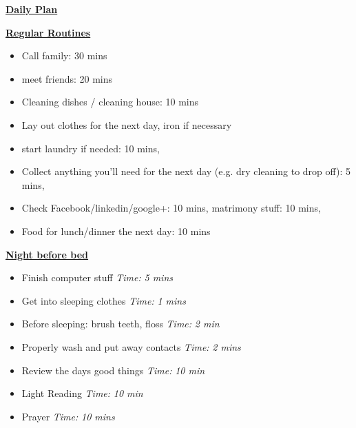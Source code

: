 \documentclass[serif,mathserif,final]{beamer}
\newcommand{\timeEst}[1]{\textit{Time:} \textit{#1}}
\begin{document}
\begin{frame}{}
\begin{columns}[t]
\begin{column}{0.27\linewidth}{\textbf{\underline{Daily Plan}}}
\begin{block}{\small \textbf{\underline{Regular Routines}} }
\begin{itemize}
\item \tiny Call family: 30 mins
\item \tiny meet friends: 20 mins
\item \tiny Cleaning dishes / cleaning house: 10 mins
\item \tiny Lay out clothes for the next day, iron if necessary
\item \tiny start laundry if needed: 10 mins,
\item \tiny Collect anything you’ll need for the next day (e.g. dry cleaning to drop off): 5 mins,
\item \tiny Check Facebook/linkedin/google+: 10 mins, matrimony stuff: 10 mins,
\item \tiny Food for lunch/dinner the next day: 10 mins
\end{itemize}

\underline{\textbf{Night before bed}}
\begin{itemize}
\item \tiny Finish computer stuff \timeEst{5 mins}
\item \tiny Get into sleeping clothes \timeEst{1 mins}
\item \tiny Before sleeping: brush teeth, floss \timeEst{ 2 min}
\item \tiny Properly wash and put away contacts \timeEst{ 2 mins}
\item \tiny Review the days good things \timeEst{ 10 min}
\item \tiny Light Reading \timeEst{ 10 min}
\item \tiny Prayer \timeEst{10 mins}
\end{itemize}
\end{block}

\end{column}%

\end{columns} 

\end{frame} 
\end{document}
